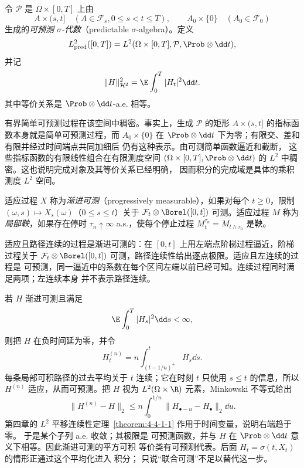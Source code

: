 \begin{definition}[$L^2$ 可预测类]\label{def:6-4-2-2}
令 $\mathcal P$ 是 $\Omega\times[0,T]$ 上由
\[
 A\times(s,t]\quad(A\in\mathcal F_s, 0\le s<t\le T),
 \qquad A_0\times\{0\}\quad(A_0\in\mathcal F_0)
\]
生成的\emph{可预测 $\sigma$-代数}（predictable $\sigma$-algebra）。定义
\[
 L^2_{\mathrm{pred}}([0,T])
 =L^2(\Omega\times[0,T],\mathcal P,\Prob\otimes\dd t),
\]
并记
\[
 \|H\|_{\mathcal H^2}^2=\E\int_0^T|H_t|^2\dd t.
\]
其中等价关系是 $\Prob\otimes\dd t$-a.e. 相等。
\end{definition}

有界简单可预测过程在该空间中稠密。事实上，生成 $\mathcal P$ 的矩形
$A\times(s,t]$ 的指标函数本身就是简单可预测过程，而
$A_0\times\{0\}$ 在 $\Prob\otimes\dd t$ 下为零；有限交、差和有限并经过时间端点共同加细后
仍有这种表示。由可测简单函数逼近和截断，
这些指标函数的有限线性组合在有限测度空间
$(\Omega\times[0,T],\Prob\otimes\dd t)$ 的 $L^2$ 中稠密。这也说明完成对象及其等价关系已经明确，
因而积分的完成域是具体的乘积测度 $L^2$ 空间。

\begin{definition}[渐进可测过程与局部鞅]\label{def:6-4-2-progressive-local}
适应过程 $X$ 称为\emph{渐进可测}（progressively measurable），如果对每个 $t\ge0$，限制
$(\omega,s)\mapsto X_s(\omega)$（$0\le s\le t$）关于
$\mathcal F_t\otimes\Borel([0,t])$ 可测。适应过程 $M$ 称为\emph{局部鞅}，如果存在停时
$\tau_n\uparrow\infty$ a.s.，使每个停止过程
$M^{\tau_n}_t=M_{t\wedge\tau_n}$ 是鞅。
\end{definition}

适应且路径连续的过程是渐进可测的：在 $[0,t]$ 上用左端点阶梯过程逼近，阶梯过程关于
$\mathcal F_t\otimes\Borel([0,t])$ 可测，路径连续性给出逐点极限。适应且左连续的过程是
可预测，同一逼近中的系数在每个区间左端以前已经可知。连续过程同时满足两项；左连续本身
并不表示路径连续。

\begin{remark}
\label{remark:6-4-2-progressive-predictable}
若 $H$ 渐进可测且满足
\[
 \E\int_0^T|H_s|^2\dd s<\infty,
\]
则把 $H$ 在负时间延为零，并令
\[
 H_t^{(n)}=n\int_{(t-1/n)^+}^{t}H_s\dd s.
\]
每条局部可积路径的过去平均关于 $t$ 连续；它在时刻 $t$ 只使用 $s\le t$ 的信息，所以
$H^{(n)}$ 适应，从而可预测。把 $H$ 视为
$L^2(\Omega\times\R)$ 元素，Minkowski 不等式给出
\[
 \|H^{(n)}-H\|_2
 \le n\int_0^{1/n}\|H_{\bullet-u}-H_\bullet\|_2\dd u.
\]
第四章的 $L^2$ 平移连续性定理~\ref{theorem:4-4-1-1} 作用于时间变量，说明右端趋于零。
于是某个子列 a.e. 收敛；其极限是
可预测函数，并与 $H$ 在 $\Prob\otimes\dd t$ 意义下相等。因此渐进可测的平方可积
等价类有可预测代表。后面 $H_t=\sigma(t,X_t)$ 的情形正通过这个平均化进入 \Ito{} 积分；
只说“联合可测”不足以替代这一步。
\end{remark}

